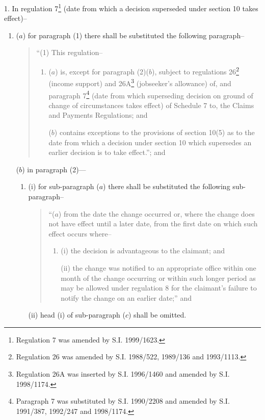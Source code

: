 \documentclass[12pt,a4paper]{article}
\begin{document}
\renewcommand\parthead{--- Schedule 19}

1.  In regulation 7\footnote{\frenchspacing Regulation 7 was amended by S.I. 1999/1623.} (date from which a decision superseded under section 10 takes effect)–
\begin{enumerate}\item[]
($a$) for paragraph (1) there shall be substituted the following paragraph–
\begin{quotation}
“(1) This regulation–
\begin{enumerate}\item[]
($a$) is, except for paragraph (2)($b$), subject to regulations 26\footnote{\frenchspacing Regulation 26 was amended by S.I. 1988/522, 1989/136 and 1993/1113.} (income support) and 26A\footnote{\frenchspacing Regulation 26A was inserted by S.I. 1996/1460 and amended by S.I. 1998/1174.} (jobseeker’s allowance) of, and paragraph 7\footnote{\frenchspacing Paragraph 7 was substituted by S.I. 1990/2208 and amended by S.I. 1991/387, 1992/247 and 1998/1174.} (date from which superseding decision on ground of change of circumstances takes effect) of Schedule 7 to, the Claims and Payments Regulations; and

($b$) contains exceptions to the provisions of section 10(5) as to the date from which a decision under section 10 which supersedes an earlier decision is to take effect.”; and
\end{enumerate}
\end{quotation}

($b$) in paragraph (2)—
\begin{enumerate}\item[]
(i) for sub-paragraph ($a$)  there shall be substituted the following sub-paragraph–
\begin{quotation}
“($a$) from the date the change occurred or, where the change does not have effect until a later date, from the first date on which such effect occurs where–
\begin{enumerate}\item[]
(i) the decision is advantageous to the claimant; and

(ii) the change was notified to an appropriate office within one month of the change occurring or within such longer period as may be allowed under regulation 8 for the claimant’s failure to notify the change on an earlier date;” and
\end{enumerate}
\end{quotation}

(ii) head (i)  of sub-paragraph ($c$)  shall be omitted.
\end{enumerate}
\end{enumerate}
\end{document}
